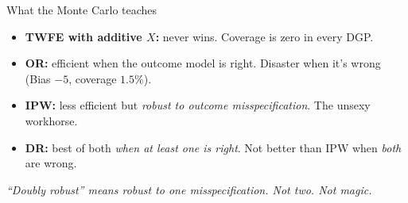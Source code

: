 \documentclass[aspectratio=169,11pt]{beamer}
\begin{document}
\begin{frame}{What the Monte Carlo teaches}
\vspace{0.4em}
\begin{itemize}\small
  \item \textbf{TWFE with additive $X$:} never wins. \;Coverage is zero in every DGP. 
  \item \textbf{OR:} efficient when the outcome model is right. Disaster when it's wrong (Bias $-5$, coverage $1.5\%$).
  \item \textbf{IPW:} less efficient but \textit{robust to outcome misspecification}. The unsexy workhorse.
  \item \textbf{DR:} best of both \textit{when at least one is right}. \;Not better than IPW when \textit{both} are wrong.
\end{itemize}
\vspace{0.4em}
\begin{center}
\small\color{warmgray}\itshape
``Doubly robust'' means \textit{robust to one misspecification.} \;Not two. \;Not magic.
\end{center}
\end{frame}

\end{document}
